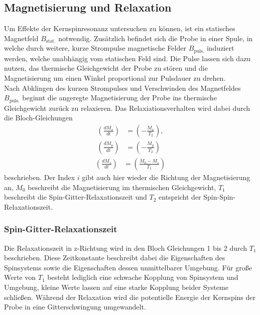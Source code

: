 \subsection{Magnetisierung und Relaxation}
\noindent Um Effekte der Kernspinresonanz untersuchen zu können, ist ein
statisches Magnetfeld $B_\text{stat.}$ notwendig. Zusätzlich befindet sich die Probe in
einer Spule, in welche durch weitere, kurze Strompulse magnetische Felder $B_\text{puls.}$ induziert
werden, welche unabhängig vom statischen Feld sind. Die Pulse lassen sich dazu nutzen, das thermische Gleichgewicht der
Probe zu stören und die Magnetisierung um einen Winkel proportional zur
Pulsdauer zu drehen. \\
\noindent Nach Abklingen des kurzen Strompulses und Verschwinden des
Magnetfeldes $B_\text{puls.}$ beginnt die angeregte Magnetisierung der Probe ins thermische
Gleichgewicht zurück zu relaxieren. Das Relaxiationsverhalten wird dabei durch
die Bloch-Gleichungen
\begin{align*}
  \left(\frac{dM_x}{dt} \right) &= \left(-\frac{M_x}{T_2} \right),  \\
  \left(\frac{dM_y}{dt} \right) &= \left(-\frac{M_y}{T_2} \right) 
\end{align*}
\begin{align}
  \left(\frac{dM_z}{dt} \right) &= \left(\frac{M_0 - M_z}{T_1} \right)
  \label{eqn:01}
\end{align}
\noindent beschrieben. Der Index $i$ gibt auch hier wieder die Richtung der
Magnetisierung an, $M_0$ beschreibt die Magnetisierung im thermischen
Gleichgewicht, $T_1$ beschreibt die Spin-Gitter-Relaxationszeit und $T_2$
entspricht der Spin-Spin-Relaxationszeit. \\
\subsubsection{Spin-Gitter-Relaxationszeit}
Die Relaxationszeit in z-Richtung wird in den Bloch Gleichungen 1 bis 2
durch $T_1$ beschrieben. Diese Zeitkonstante beschreibt dabei die Eigenschaften
des Spinsystems sowie die Eigenschaften dessen unmittelbarer Umgebung. Für große
Werte von $T_1$ besteht lediglich eine schwache Kopplung von Spinsystem und
Umgebung, kleine Werte lassen auf eine starke Kopplung beider Systeme schließen.
Während der Relaxation wird die potentielle Energie der Kernspins der Probe in
eine Gitterschwingung umgewandelt. \\
